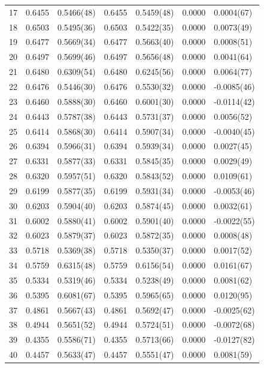 \documentclass[aps, prc, tightenlines,superscriptaddress, letterpaper, amsmath, amssymb, preprintnumbers, floatfix, longbibliography, nofootinbib]{revtex4-2}
\begin{document}
\begin{table}[!htb]
{\begin{tabularx}{\textwidth}{| c || Y | Y | Y | Y | Y | Y |}
17	&	0.6455	&	0.5466(48)	&	0.6455	&	0.5459(48)	&	0.0000	&	0.0004(67)	\\
18	&	0.6503	&	0.5495(36)	&	0.6503	&	0.5422(35)	&	0.0000	&	0.0073(49)	\\
19	&	0.6477	&	0.5669(34)	&	0.6477	&	0.5663(40)	&	0.0000	&	0.0008(51)	\\
20	&	0.6497	&	0.5699(46)	&	0.6497	&	0.5656(48)	&	0.0000	&	0.0041(64)	\\
21	&	0.6480	&	0.6309(54)	&	0.6480	&	0.6245(56)	&	0.0000	&	0.0064(77)	\\
22	&	0.6476	&	0.5446(30)	&	0.6476	&	0.5530(32)	&	0.0000	&	-0.0085(46)	\\
23	&	0.6460	&	0.5888(30)	&	0.6460	&	0.6001(30)	&	0.0000	&	-0.0114(42)	\\
24	&	0.6443	&	0.5787(38)	&	0.6443	&	0.5731(37)	&	0.0000	&	0.0056(52)	\\
25	&	0.6414	&	0.5868(30)	&	0.6414	&	0.5907(34)	&	0.0000	&	-0.0040(45)	\\
26	&	0.6394	&	0.5966(31)	&	0.6394	&	0.5939(34)	&	0.0000	&	0.0027(45)	\\
27	&	0.6331	&	0.5877(33)	&	0.6331	&	0.5845(35)	&	0.0000	&	0.0029(49)	\\
28	&	0.6320	&	0.5957(51)	&	0.6320	&	0.5843(52)	&	0.0000	&	0.0109(61)	\\
29	&	0.6199	&	0.5877(35)	&	0.6199	&	0.5931(34)	&	0.0000	&	-0.0053(46)	\\
30	&	0.6203	&	0.5904(40)	&	0.6203	&	0.5874(45)	&	0.0000	&	0.0032(61)	\\
31	&	0.6002	&	0.5880(41)	&	0.6002	&	0.5901(40)	&	0.0000	&	-0.0022(55)	\\
32	&	0.6023	&	0.5879(37)	&	0.6023	&	0.5872(35)	&	0.0000	&	0.0008(48)	\\
33	&	0.5718	&	0.5369(38)	&	0.5718	&	0.5350(37)	&	0.0000	&	0.0017(52)	\\
34	&	0.5759	&	0.6315(48)	&	0.5759	&	0.6156(54)	&	0.0000	&	0.0161(67)	\\
35	&	0.5334	&	0.5319(46)	&	0.5334	&	0.5238(49)	&	0.0000	&	0.0081(62)	\\
36	&	0.5395	&	0.6081(67)	&	0.5395	&	0.5965(65)	&	0.0000	&	0.0120(95)	\\
37	&	0.4861	&	0.5667(43)	&	0.4861	&	0.5692(47)	&	0.0000	&	-0.0025(62)	\\
38	&	0.4944	&	0.5651(52)	&	0.4944	&	0.5724(51)	&	0.0000	&	-0.0072(68)	\\
39	&	0.4355	&	0.5586(71)	&	0.4355	&	0.5713(66)	&	0.0000	&	-0.0127(82)	\\
40	&	0.4457	&	0.5633(47)	&	0.4457	&	0.5551(47)	&	0.0000	&	0.0081(59)	\\

\end{tabularx}}
\end{table}
\end{document}
